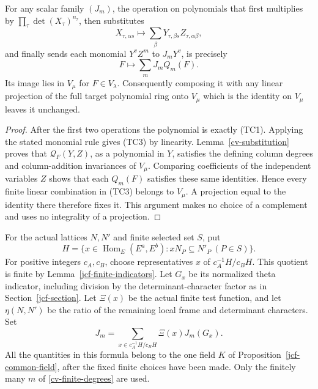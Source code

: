 \begin{lemma}\label{tvc-jet-map}
For any scalar family $(J_m)$, the operation on polynomials that
first multiplies by $\prod_\tau\det(X_\tau)^{n_\tau}$,
then substitutes
\[
              X_{\tau,\alpha s}
                   \longmapsto
                  \sum_\beta Y_{\tau,\beta s}Z_{\tau,\alpha\beta},
\]
and finally sends each monomial $Y^vZ^m$ to $J_mY^v$, is
precisely
\[
                       F\longmapsto\sum_m J_mQ_m(F).
                                                               \tag{TC3}
\]
Its image lies in $V_\mu$ for $F\in V_\lambda$. Consequently
composing it with any linear projection of the full target polynomial
ring onto $V_\mu$ which is the identity on $V_\mu$ leaves it unchanged.
\end{lemma}
\begin{proof}
After the first two operations the polynomial is exactly (TC1).
Applying the stated monomial rule gives (TC3) by linearity.
Lemma~\ref{cv-substitution} proves that $\mathcal Q_F(Y,Z)$,
as a polynomial in $Y$, satisfies the defining column degrees and
column-addition invariances of $V_\mu$. Comparing coefficients of
the independent variables $Z$ shows that each $Q_m(F)$ satisfies
these same identities. Hence every finite linear combination in
(TC3) belongs to $V_\mu$. A projection equal to the identity there
therefore fixes it. This argument makes no choice of a complement
and uses no integrality of a projection.
\end{proof}

For the actual lattices $N,N'$ and finite selected set $S$, put
\[
 H=\{x\in\operatorname{Hom}_E(E^a,E^b):xN_P\subseteq N'_P
                                                \ (P\in S)\}.
\]
For positive integers $c_A,c_B$, choose representatives $x$ of
$c_A^{-1}H/c_BH$. This quotient is finite by
Lemma~\ref{jcf-finite-indicators}. Let $G_x$ be its normalized
theta indicator, including division by the determinant-character
factor as in Section~\ref{jcf-section}. Let $\Xi(x)$ be the actual
finite test function, and let $\eta(N,N')$ be the ratio of the
remaining local frame and determinant characters. Set
\[
                 J_m=\sum_{x\in c_A^{-1}H/c_BH}
                                  \Xi(x)J_m(G_x).
                                                               \tag{TC4}
\]
All the quantities in this formula belong to the one field $K$
of Proposition~\ref{jcf-common-field}, after the fixed finite
choices have been made. Only the finitely many $m$ of
\eqref{cv-finite-degrees} are used.

